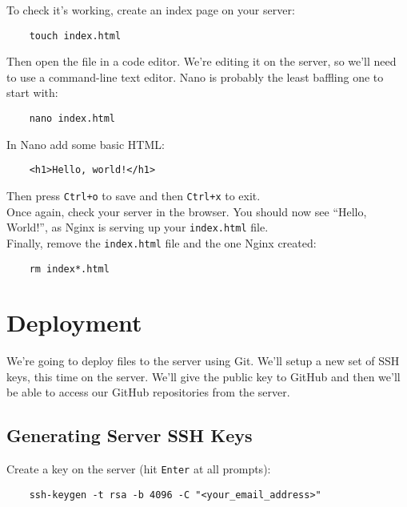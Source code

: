 To check it's working, create an index page on your server:

\begin{verbatim}
    touch index.html
\end{verbatim}

Then open the file in a code editor. We're editing it on the server, so we'll need to use a command-line text editor. Nano is probably the least baffling one to start with:

\begin{verbatim}
    nano index.html
\end{verbatim}

In Nano add some basic HTML:

\begin{verbatim}
    <h1>Hello, world!</h1>
\end{verbatim}

Then press \texttt{Ctrl+o} to save and then \texttt{Ctrl+x} to exit.
\\

Once again, check your server in the browser. You should now see ``Hello, World!'', as Nginx is serving up your \texttt{index.html} file.
\\

Finally, remove the \texttt{index.html} file and the one Nginx created:

\begin{verbatim}
    rm index*.html
\end{verbatim}


\section{Deployment}

We're going to deploy files to the server using Git. We'll setup a new set of SSH keys, this time on the server. We'll give the public key to GitHub and then we'll be able to access our GitHub repositories from the server.


\subsection{Generating Server SSH Keys}

Create a key on the server (hit \texttt{Enter} at all prompts):

\begin{verbatim}
    ssh-keygen -t rsa -b 4096 -C "<your_email_address>"
\end{verbatim}

